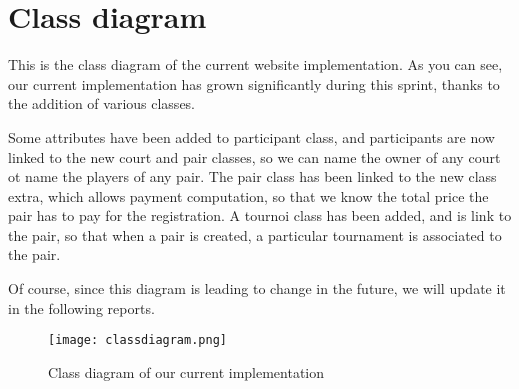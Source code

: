 \section{Class diagram}

This is the class diagram of the current website implementation. As you can see, our current implementation has grown significantly during this sprint, thanks to the addition of various classes. \newline

Some attributes have been added to participant class, and participants are now linked to the new court and pair classes, so we can name the owner of any court ot name the players of any pair. The pair class has been linked to the new class extra, which allows payment computation, so that we know the total price the pair has to pay for the registration. A tournoi class has been added, and is link to the pair, so that when a pair is created, a particular tournament is associated to the pair. \newline

Of course, since this diagram is leading to change in the future, we will update it in the following reports.

\begin{figure}[!ht]
	\centering
	\texttt{[image: classdiagram.png]}
	\caption{Class diagram of our current implementation}
	\label{fig:length_eight_mouse}
\end{figure}
\FloatBarrier
